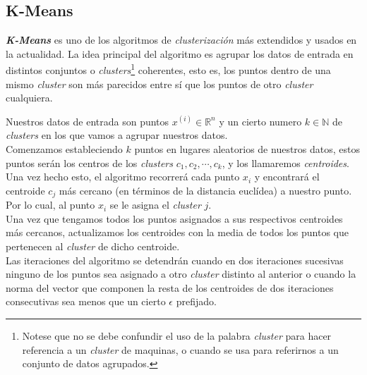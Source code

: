 \subsection{K-Means}
\textbf{\textit{K-Means}} es uno de los algoritmos de \textit{clusterización} más 
extendidos y usados en la actualidad. La idea principal del algoritmo es agrupar los datos de entrada 
en distintos conjuntos o \textit{clusters}\footnote{Notese que no se debe confundir el uso de la 
palabra \textit{cluster} para hacer referencia a un \textit{cluster} de maquinas, o cuando se usa 
para referirnos a un conjunto de datos agrupados.} 
coherentes, esto es, los puntos dentro de una mismo \textit{cluster} son más parecidos entre sí 
que los puntos de otro \textit{cluster} cualquiera.
\newline

Nuestros datos de entrada son puntos $x^{(i)} \in \mathds{R}^n$ y un cierto numero $k \in \mathds{N}$ de 
\textit{clusters} en los que vamos a agrupar nuestros datos.\\
Comenzamos estableciendo $k$ puntos en lugares aleatorios de nuestros datos, estos puntos serán los 
centros de los \textit{clusters} $c_1, c_2, \cdots, c_k$, y los llamaremos \textit{centroides}.
Una vez hecho esto, el algoritmo recorrerá cada punto $x_i$ y encontrará el centroide $c_j$ más 
cercano (en términos de la distancia euclídea) a nuestro punto. Por lo cual, al punto $x_i$ se le 
asigna el \textit{cluster} $j$.\\
Una vez que tengamos todos los puntos asignados a sus respectivos centroides más cercanos, actualizamos 
los centroides con la media de todos los puntos que pertenecen al \textit{cluster} de dicho centroide.\\
Las iteraciones del algoritmo se detendrán cuando en dos iteraciones sucesivas ninguno de los puntos 
sea asignado a otro \textit{cluster} distinto al anterior o cuando la norma del vector que componen 
la resta de los centroides de dos iteraciones consecutivas sea menos que un cierto $\epsilon$ 
prefijado.
\newline

